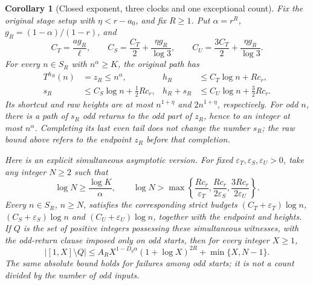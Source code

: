 \documentclass[11pt]{article}
\newtheorem{corollary}[proposition]{Corollary}
\theoremstyle{remark}\newtheorem{remark}[proposition]{Remark}
\begin{document}
\begin{corollary}[Closed exponent, three clocks and one exceptional count]
\label{cor:shaik-closed-graded}
Fix the original stage setup with \(\eta<r-a_0\), and fix \(R\ge1\).
Put \(\alpha=r^R\), \(g_R=(1-\alpha)/(1-r)\), and
\begin{equation}\label{eq:shaik-closed-coefficients}
 C_T=\frac{a g_R}{\ell},\qquad
 C_S=\frac{C_T}{2}+\frac{\eta g_R}{\log3},\qquad
 C_U=\frac{3C_T}{2}+\frac{\eta g_R}{\log3}.
\end{equation}
For every \(n\in S_R\) with \(n^\alpha\ge K\), the original path has
\begin{align}
 T^{h_R}(n)&=z_R\le n^\alpha,&
 h_R&\le C_T\log n+R c_r, \label{eq:shaik-closed-shortcut}\\
 s_R&\le C_S\log n+\tfrac12 R c_r,&
 h_R+s_R&\le C_U\log n+\tfrac32 R c_r .
 \label{eq:shaik-closed-three}
\end{align}
Its shortcut and raw heights are at most \(n^{1+\eta}\) and
\(2n^{1+\eta}\), respectively. For odd \(n\), there is a path of
\(s_R\) odd returns to the odd part of \(z_R\), hence to an integer
at most \(n^\alpha\). Completing its last even tail does not change
the number \(s_R\); the raw bound above refers to the endpoint \(z_R\)
before that completion.

Here is an explicit simultaneous asymptotic version. For fixed
\(\varepsilon_T,\varepsilon_S,\varepsilon_U>0\), take any integer
\(N\ge2\) such that
\begin{equation}\label{eq:shaik-closed-cutoff}
 \log N\ge\frac{\log K}{\alpha},\qquad
 \log N>
 \max\left\{\frac{Rc_r}{\varepsilon_T},
            \frac{Rc_r}{2\varepsilon_S},
            \frac{3Rc_r}{2\varepsilon_U}\right\}.
\end{equation}
Every \(n\in S_R\), \(n\ge N\), satisfies the corresponding strict
budgets \((C_T+\varepsilon_T)\log n\),
\((C_S+\varepsilon_S)\log n\) and
\((C_U+\varepsilon_U)\log n\), together with the endpoint and heights.
If \(Q\) is the set of positive integers possessing these simultaneous
witnesses, with the odd-return clause imposed only on odd starts, then
for every integer \(X\ge1\),
\begin{equation}\label{eq:shaik-closed-count}
 |[1,X]\setminus Q|
 \le A_R X^{1-D_\eta\alpha}(1+\log X)^{2R}
       +\min\{X,N-1\}.
\end{equation}
The same absolute bound holds for failures among odd starts; it is not
a count divided by the number of odd inputs.
\end{corollary}
\end{document}
